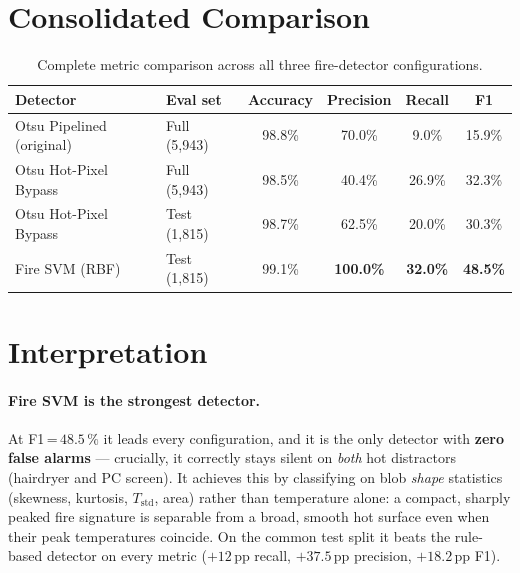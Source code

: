 \documentclass[11pt, a4paper]{article}
\begin{document}
\section{Consolidated Comparison}

\begin{table}[H]
\centering
\caption{Complete metric comparison across all three fire-detector configurations.}
\renewcommand{\arraystretch}{1.35}
\begin{tabular}{llcccc}
\toprule
\textbf{Detector} & \textbf{Eval set}
    & \textbf{Accuracy} & \textbf{Precision} & \textbf{Recall} & \textbf{F1} \\
\midrule
Otsu Pipelined (original)
    & Full (5{,}943) & 98.8\% & 70.0\%          & 9.0\%  & 15.9\% \\
Otsu Hot-Pixel Bypass
    & Full (5{,}943) & 98.5\% & 40.4\%          & 26.9\% & 32.3\% \\
\addlinespace
Otsu Hot-Pixel Bypass
    & Test (1{,}815) & 98.7\% & 62.5\%          & 20.0\% & 30.3\% \\
Fire SVM (RBF)
    & Test (1{,}815) & 99.1\% & \textbf{100.0\%}& \textbf{32.0\%} & \textbf{48.5\%} \\
\bottomrule
\end{tabular}
\label{tab:full}
\end{table}

\section{Interpretation}\label{sec:interp}

\paragraph{Fire SVM is the strongest detector.}  At F1\,=\,$48.5\,\%$ it leads every
configuration, and it is the only detector with \textbf{zero false alarms} —
crucially, it correctly stays silent on \emph{both} hot distractors (hairdryer and PC
screen).  It achieves this by classifying on blob \emph{shape} statistics (skewness,
kurtosis, $T_{\text{std}}$, area) rather than temperature alone: a compact, sharply
peaked fire signature is separable from a broad, smooth hot surface even when their peak
temperatures coincide.  On the common test split it beats the rule-based detector on
every metric ($+12$\,pp recall, $+37.5$\,pp precision, $+18.2$\,pp F1).
\end{document}

